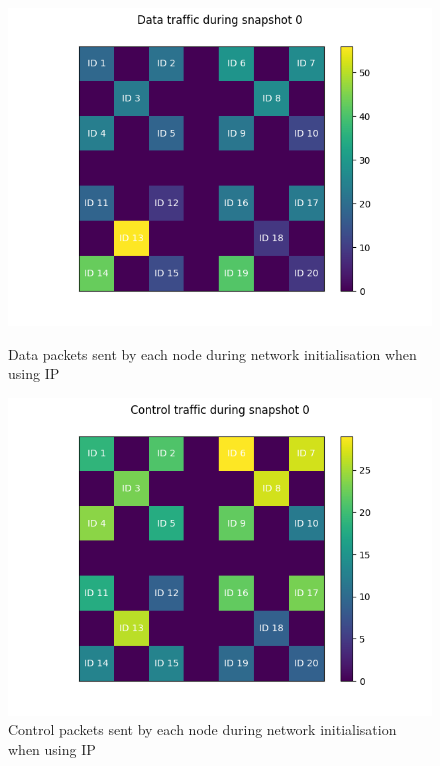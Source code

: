 \documentclass[12pt]{article}
\begin{document}
\begin{figure}[!ht]
    \centering
    \begin{minipage}{0.45\textwidth}
        \centering
        \includegraphics[width=\textwidth]{images/ip/snapshot0-Data.png} %
        \caption{Data packets sent by each node during network initialisation when using IP}
        \label{fig:ipdatasnapone}
    \end{minipage}\hfill
    \begin{minipage}{0.45\textwidth}
        \centering
        \includegraphics[width=\textwidth]{images/ip/snapshot0-Control.png} %
        \caption{Control packets sent by each node during network initialisation when using IP}
        \label{fig:ipctrlsnapone}
    \end{minipage}
\end{figure}
\end{document}
